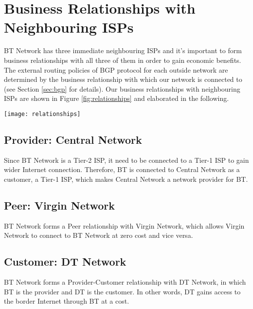 \section{Business Relationships with Neighbouring ISPs}
\label{sec:relationships}

BT Network has three immediate neighbouring ISPs and it's important to form business relationships with all three of them in order to gain economic benefits. 
The external routing policies of BGP protocol for each outside network are determined by the business relationship with which our network is connected to (see Section \ref{sec:bgp} for details).
Our business relationships with neighbouring ISPs are shown in Figure \ref{fig:relationships} and elaborated in the following.

\begin{figure*}[ht!]
    \centering
    \texttt{[image: relationships]}
    \caption{Business Relationships of BT Network with Neighbouring ISPs.}
    \label{fig:relationships}
\end{figure*}


\subsection{Provider: Central Network}
Since BT Network is a Tier-2 ISP, it need to be connected to a Tier-1 ISP to gain wider Internet connection. Therefore, BT is connected to Central Network as a customer, a Tier-1 ISP, which makes Central Network a network provider for BT.

\subsection{Peer: Virgin Network}
BT Network forms a Peer relationship with Virgin Network, which allows Virgin Network to connect to BT Network at zero cost and vice versa.

\subsection{Customer: DT Network}
\label{sec:dt}
BT Network forms a Provider-Customer relationship with DT Network, in which BT is the provider and DT is the customer. In other words, DT gains access to the border Internet through BT at a cost.
